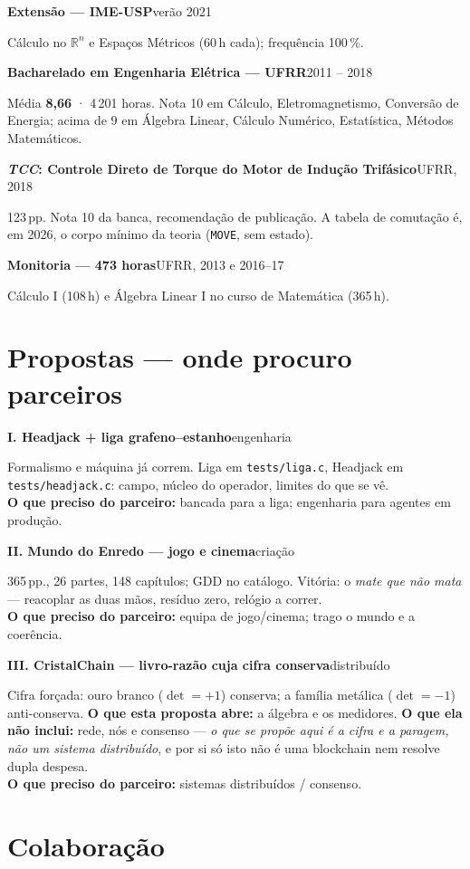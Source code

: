 \documentclass[11pt,a4paper]{article}
\newcommand{\lin}[2]{\noindent\textbf{#1}\hfill{\color{cinza}\small #2}\par}
\begin{document}
\smallskip
\lin{Extensão --- IME-USP}{verão 2021}
Cálculo no $\mathbb{R}^n$ e Espaços Métricos (60\,h cada); frequência 100\,\%.

\smallskip
\lin{Bacharelado em Engenharia Elétrica --- UFRR}{2011 -- 2018}
Média \textbf{8{,}66} · 4\,201 horas. Nota 10 em Cálculo, Eletromagnetismo, Conversão de Energia;
acima de 9 em Álgebra Linear, Cálculo Numérico, Estatística, Métodos Matemáticos.

\smallskip
\lin{\emph{TCC}: Controle Direto de Torque do Motor de Indução Trifásico}{UFRR, 2018}
123\,pp. Nota 10 da banca, recomendação de publicação. A tabela de comutação é, em 2026,
o corpo mínimo da teoria (\texttt{MOVE}, sem estado).

\smallskip
\lin{Monitoria --- 473 horas}{UFRR, 2013 e 2016--17}
Cálculo I (108\,h) e Álgebra Linear I no curso de Matemática (365\,h).

\section*{Propostas --- onde procuro parceiros}

\lin{\textbf{I.} Headjack + liga grafeno--estanho}{engenharia}
Formalismo e máquina já correm. Liga em \texttt{tests/liga.c}, Headjack em
\texttt{tests/headjack.c}: campo, núcleo do operador, limites do que se vê.
\\[1pt]
\textbf{O que preciso do parceiro:} bancada para a liga; engenharia para agentes em produção.

\smallskip
\lin{\textbf{II.} Mundo do Enredo --- jogo e cinema}{criação}
365\,pp., 26 partes, 148 capítulos; GDD no catálogo. Vitória: o \emph{mate que
não mata} --- reacoplar as duas mãos, resíduo zero, relógio a correr.
\\[1pt]
\textbf{O que preciso do parceiro:} equipa de jogo/cinema; trago o mundo e a coerência.

\smallskip
\lin{\textbf{III.} CristalChain --- livro-razão cuja cifra conserva}{distribuído}
Cifra forçada: ouro branco ($\det=+1$) conserva; a família metálica ($\det=-1$) anti-conserva.
\textbf{O que esta proposta abre:} a álgebra e os medidores. \textbf{O que ela não inclui:}
rede, nós e consenso --- \emph{o que se propõe aqui é a cifra e a paragem, não um sistema
distribuído}, e por si só isto não é uma blockchain nem resolve dupla despesa.
\\[1pt]
\textbf{O que preciso do parceiro:} sistemas distribuídos / consenso.

\section*{Colaboração}
\end{document}
